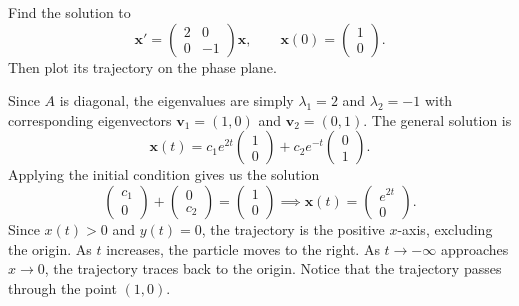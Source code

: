 \documentclass[11pt,letterpaper]{article}
\begin{document}
\begin{example}[1]{
Find the solution to 
\[
\mathbf{x}'=\begin{pmatrix}2&0\\0&-1\end{pmatrix}\mathbf{x},\qquad
\mathbf{x}(0)=\begin{pmatrix}1\\0\end{pmatrix}.
\]
Then plot its trajectory on the phase plane.
}

Since $A$ is diagonal, the eigenvalues are simply $\lambda_1=2$ and $\lambda_2=-1$ with corresponding eigenvectors $\textbf{v}_1=(1,0)$ and $\textbf{v}_2=(0,1)$. The general solution is
\[
\mathbf{x}(t)=c_1e^{2t}\begin{pmatrix}1\\0\end{pmatrix}
+c_2e^{-t}\begin{pmatrix}0\\1\end{pmatrix}.
\]
Applying the initial condition gives us the solution
\[
\begin{pmatrix}c_1\\0
    
\end{pmatrix} + \begin{pmatrix}
    0\\c_2
\end{pmatrix} = \begin{pmatrix}
    1\\0
\end{pmatrix}
\implies 
\mathbf{x}(t)=\begin{pmatrix}e^{2t}\\0\end{pmatrix}.
\]
Since $x(t)>0$ and $y(t)=0$, the trajectory is the positive $x$-axis, excluding the origin. As $t$ increases, the particle moves to the right. As $t\to-\infty$ approaches $x\to 0$, the trajectory traces back to the origin. Notice that the trajectory passes through the point $(1,0)$.

\begin{center}
\end{center}
\end{example}
\end{document}
